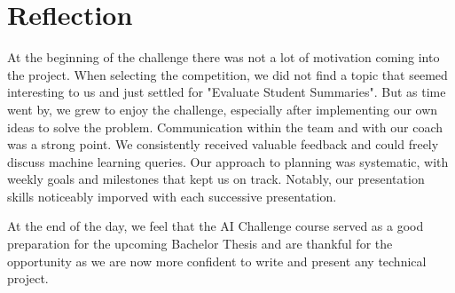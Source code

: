\chapter{Reflection}
At the beginning of the challenge there was not a lot of motivation coming into the project.
When selecting the competition, we did not find a topic that seemed interesting to us and just settled for "Evaluate Student Summaries".
But as time went by, we grew to enjoy the challenge, especially after implementing our own ideas to solve the problem.
Communication within the team and with our coach was a strong point. We consistently received valuable feedback and could freely discuss machine learning queries. 
Our approach to planning was systematic, with weekly goals and milestones that kept us on track. Notably, our presentation skills noticeably imporved with each successive presentation.

\vspace{1em}

\noindent At the end of the day, we feel that the AI Challenge course served as a good preparation for the upcoming Bachelor Thesis
and are thankful for the opportunity as we are now more confident to write and present any technical project.
